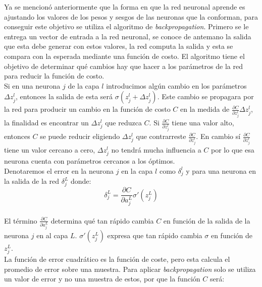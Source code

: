 \documentclass{iccmemoria}
\begin{document}
Ya se mencionó anteriormente que la forma en que la red neuronal aprende es ajustando los valores de los pesos y sesgos de las neuronas que la conforman, para conseguir este objetivo se utiliza el algoritmo de \emph{backpropagation}. Primero se le entrega un vector de entrada a la red neuronal, se conoce de antemano la salida que esta debe generar con estos valores, la red computa la salida y esta se compara con la esperada mediante una función de costo. El algoritmo tiene el objetivo de determinar qué cambios hay que hacer a los parámetros de la red para reducir la función de costo.\\

Si en una neurona $j$ de la capa $l$ introducimos algún cambio en los parámetros $\Delta z^l_j$, entonces la salida de esta será $\sigma(z^l_j + \Delta z^l_j)$. Este cambio se propagara por la red para producir un cambio en la función de costo $C$ en la medida de $\frac{\partial C}{\partial z^l_j} \Delta z^l_j$, la finalidad es encontrar un $\Delta z^l_j$ que reduzca $C$. Si $\frac{\partial C}{\partial z^l_j}$ tiene una valor alto, entonces $C$ se puede reducir eligiendo $\Delta z^l_j$ que contrarreste $\frac{\partial C}{\partial z^l_j}$. En cambio sí $\frac{\partial C}{\partial z^l_j}$ tiene un valor cercano a cero, $\Delta z^l_j$ no tendrá mucha influencia a $C$ por lo que esa neurona cuenta con parámetros cercanos a los óptimos.\\

Denotaremos el error en la neurona $j$ en la capa $l$ como $\delta^l_j$ y para una neurona en la salida de la red $\delta^L_j$ donde:\\

\begin{equation}
	\delta^L_j = \frac{\partial C}{\partial a^L_j} \sigma'(z^L_j)
\end{equation}\\

El término $\frac{\partial C}{\partial a^L_j}$ determina qué tan rápido cambia $C$ en función de la salida de la neurona $j$ en al capa $L$. $\sigma'(z^L_j)$ expresa que tan rápido cambia $\sigma$ en función de $z^L_j$.\\
 
La función de error cuadrático es la función de coste, pero esta calcula el promedio de error sobre una muestra. Para aplicar \emph{backpropagation} solo se utiliza un valor de error y no una muestra de estos, por que la función $C$ será:\\
\end{document}
